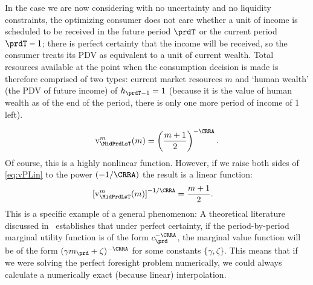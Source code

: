 \documentclass[titlepage, headings=optiontotocandhead]{econtex}
\begin{document}
In the case we are now considering with no uncertainty and no liquidity constraints, the optimizing consumer does not care whether a unit of income is scheduled to be received in the future period $\prdT$ or the current period $\prdT-1$; there is perfect certainty that the income will be received, so the consumer treats its PDV as equivalent to a unit of current wealth.  Total resources available at the point when the consumption decision is made is therefore comprised of two types: current market resources $m$ and `human wealth' (the PDV of future income) of $h_{\prdT-1}=1$ (because it is the value of human wealth as of the end of the period, there is only one more period of income of 1 left).

\begin{equation}
  \mathrm{v}^{m}_{\MidPrdLsT}(m)  = \left(\frac{m+1}{2}\right)^{-\CRRA} \label{eq:vPLin}.
\end{equation}
Of course, this is a highly nonlinear function.  However, if we raise both sides of \eqref{eq:vPLin} to the power $(-1/\CRRA)$ the result is a linear function:
\begin{equation}\begin{gathered}\begin{aligned}
      \left[\mathrm{v}^{m}_{\MidPrdLsT}(m)\right]^{-1/\CRRA}  & = \frac{m+1}{2}  .
    \end{aligned}\end{gathered}\end{equation}
This is a specific example of a general phenomenon: A theoretical literature discussed in~\cite{ckConcavity} establishes that under perfect certainty, if the period-by-period marginal utility function is of the form $c_{\prd}^{-\CRRA}$, the marginal value function will be of the form $(\gamma m_{\prd}+\zeta)^{-\CRRA}$ for some constants $\{\gamma,\zeta\}$.  This means that if we were solving the perfect foresight problem numerically, we could always calculate a numerically exact (because linear) interpolation.
\end{document}
